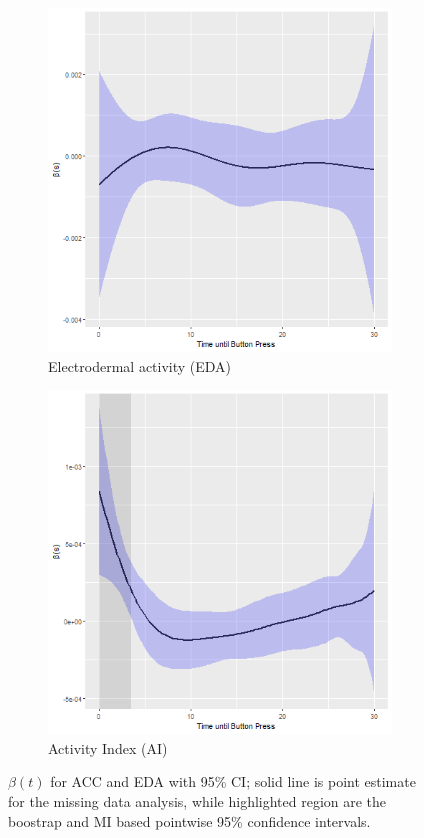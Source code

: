 \documentclass[12pt]{amsart}
\begin{document}
\begin{figure}[!th]
\centering
\begin{subfigure}{.5\textwidth}
  \centering
  \includegraphics[width=.8\linewidth]{../figures/eda_coef_joint_bootstrap.png}
  \caption{Electrodermal activity (EDA)}
  \label{fig:eda_estimate_bs}
\end{subfigure}%
\begin{subfigure}{.5\textwidth}
  \centering
  \includegraphics[width=.8\linewidth]{../figures/acc_coef_joint_bootstrap.png}
  \caption{Activity Index (AI)
}  \label{fig:acc_estimate_bs}
\end{subfigure}
\caption{$\beta (t)$ for ACC and EDA with 95\% CI; solid line is point estimate for the missing data analysis, while highlighted region are the boostrap and MI based pointwise 95\% confidence intervals.}
\label{fig:edacc_estimate_bs}
\end{figure}
\end{document}
